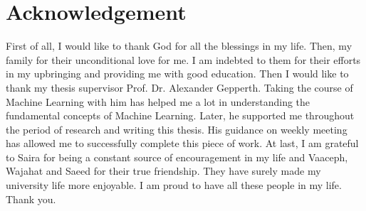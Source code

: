 \chapter*{Acknowledgement}

First of all, I would like to thank God for all the blessings in my life. Then, my family for their unconditional love for me. I am indebted to them for their efforts in my upbringing and providing me with good education.
\newline
\newline
Then I would like to thank my thesis supervisor Prof. Dr. Alexander Gepperth. Taking the course of Machine Learning with him has helped me a lot in understanding the fundamental concepts of Machine Learning. Later, he supported me throughout the period of research and writing this thesis. His guidance on weekly meeting has allowed me to successfully complete this piece of work.
\newline
\newline
At last, I am grateful to Saira for being a constant source of encouragement in my life and Vaaceph, Wajahat and Saeed for their true friendship. They have surely made my university life more enjoyable.
\newline
\newline
I am proud to have all these people in my life. Thank you.